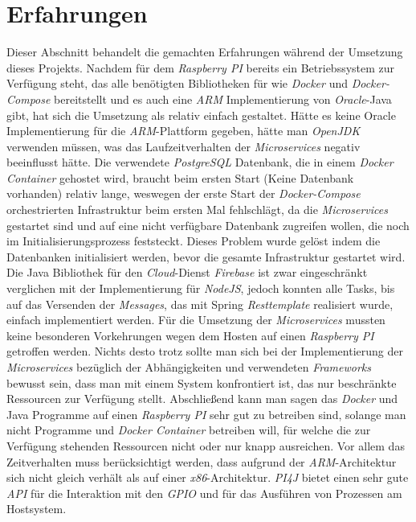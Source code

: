 \section{Erfahrungen}
Dieser Abschnitt behandelt die gemachten Erfahrungen während der Umsetzung dieses Projekts. Nachdem für dem \emph{Raspberry PI} bereits ein Betriebssystem zur Verfügung steht, das alle benötigten Bibliotheken für wie \emph{Docker} und \emph{Docker-Compose} bereitstellt und es auch eine \emph{ARM} Implementierung von \emph{Oracle}-Java gibt, hat sich die Umsetzung als relativ einfach gestaltet. Hätte es keine Oracle Implementierung für die \emph{ARM}-Plattform gegeben, hätte man \emph{OpenJDK} verwenden müssen, was das Laufzeitverhalten der \emph{Microservices} negativ beeinflusst hätte.   
\newline
\newline
Die verwendete \emph{PostgreSQL} Datenbank, die in einem \emph{Docker Container} gehostet wird, braucht beim ersten Start (Keine Datenbank vorhanden) relativ lange, weswegen der erste Start der \emph{Docker-Compose} orchestrierten  Infrastruktur beim ersten Mal fehlschlägt, da die \emph{Microservices} gestartet sind und auf eine nicht verfügbare Datenbank zugreifen wollen, die noch im Initialisierungsprozess feststeckt. Dieses Problem wurde gelöst indem die Datenbanken initialisiert werden, bevor die gesamte Infrastruktur gestartet wird.
\newline
\newline
Die Java Bibliothek für den \emph{Cloud}-Dienst \emph{Firebase} ist zwar eingeschränkt verglichen mit der Implementierung für \emph{NodeJS}, jedoch konnten alle Tasks, bis auf das Versenden der \emph{Messages}, das mit Spring \emph{Resttemplate} realisiert wurde, einfach implementiert werden. 
\newline
\newline
Für die Umsetzung der \emph{Microservices} mussten keine besonderen Vorkehrungen wegen dem Hosten auf einen \emph{Raspberry PI} getroffen werden. Nichts desto trotz sollte man sich bei der Implementierung der \emph{Microservices} bezüglich der Abhängigkeiten und verwendeten \emph{Frameworks} bewusst sein, dass man mit einem System konfrontiert ist, das nur beschränkte Ressourcen zur Verfügung stellt.
\newline
\newline
Abschließend kann man sagen das \emph{Docker} und Java Programme auf einen \emph{Raspberry PI} sehr gut zu betreiben sind, solange man nicht Programme und \emph{Docker Container} betreiben will, für welche die zur Verfügung stehenden Ressourcen nicht oder nur knapp ausreichen. Vor allem das Zeitverhalten muss berücksichtigt werden, dass aufgrund der \emph{ARM}-Architektur sich nicht gleich verhält als auf einer \emph{x86}-Architektur. \emph{PI4J} bietet einen sehr gute \emph{API} für die Interaktion mit den \emph{GPIO} und für das Ausführen von Prozessen am Hostsystem.  